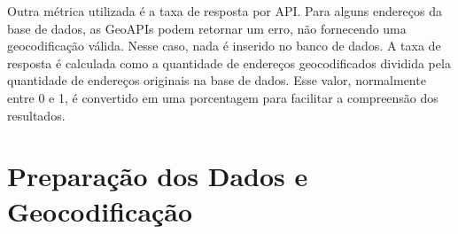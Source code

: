 Outra métrica utilizada é a taxa de resposta por API. Para alguns endereços da base de dados, as GeoAPIs podem retornar um erro, não fornecendo uma geocodificação válida. Nesse caso, nada é inserido no banco de dados. A taxa de resposta é calculada como a quantidade de endereços geocodificados dividida pela quantidade de endereços originais na base de dados. Esse valor, normalmente entre 0 e 1, é convertido em uma porcentagem para facilitar a compreensão dos resultados.


\section{Preparação dos Dados e Geocodificação}


